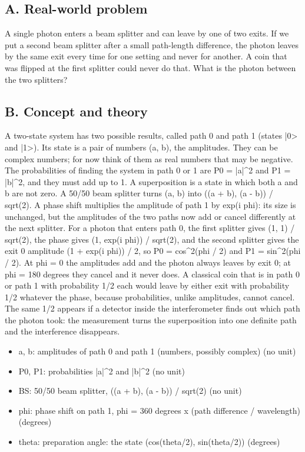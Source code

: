 \documentclass[11pt,a4paper]{article}
\begin{document}
\subsection*{A. Real-world problem}
A single photon enters a beam splitter and can leave by one of two exits. If we put a second beam splitter after a small path-length difference, the photon leaves by the same exit every time for one setting and never for another. A coin that was flipped at the first splitter could never do that. What is the photon between the two splitters?

\subsection*{B. Concept and theory}
A two-state system has two possible results, called path 0 and path 1 (states |0> and |1>). Its state is a pair of numbers (a, b), the amplitudes. They can be complex numbers; for now think of them as real numbers that may be negative. The probabilities of finding the system in path 0 or 1 are P0 = |a|\textasciicircum{}2 and P1 = |b|\textasciicircum{}2, and they must add up to 1. A superposition is a state in which both a and b are not zero. A 50/50 beam splitter turns (a, b) into ((a + b), (a - b)) / sqrt(2). A phase shift multiplies the amplitude of path 1 by exp(i phi): its size is unchanged, but the amplitudes of the two paths now add or cancel differently at the next splitter. For a photon that enters path 0, the first splitter gives (1, 1) / sqrt(2), the phase gives (1, exp(i phi)) / sqrt(2), and the second splitter gives the exit 0 amplitude (1 + exp(i phi)) / 2, so P0 = cos\textasciicircum{}2(phi / 2) and P1 = sin\textasciicircum{}2(phi / 2). At phi = 0 the amplitudes add and the photon always leaves by exit 0; at phi = 180 degrees they cancel and it never does. A classical coin that is in path 0 or path 1 with probability 1/2 each would leave by either exit with probability 1/2 whatever the phase, because probabilities, unlike amplitudes, cannot cancel. The same 1/2 appears if a detector inside the interferometer finds out which path the photon took: the measurement turns the superposition into one definite path and the interference disappears.

\begin{itemize}[nosep]
\item a, b: amplitudes of path 0 and path 1 (numbers, possibly complex) (no unit)
\item P0, P1: probabilities |a|\textasciicircum{}2 and |b|\textasciicircum{}2 (no unit)
\item BS: 50/50 beam splitter, ((a + b), (a - b)) / sqrt(2) (no unit)
\item phi: phase shift on path 1, phi = 360 degrees x (path difference / wavelength) (degrees)
\item theta: preparation angle: the state (cos(theta/2), sin(theta/2)) (degrees)
\end{itemize}
\end{document}
